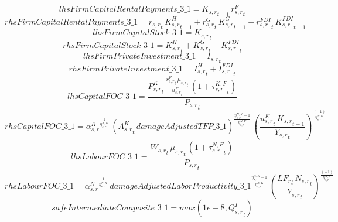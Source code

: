 \begin{dmath*}
lhsFirmCapitalRentalPayments\_3\_1 = {{K_{s,r}}}_{t-1}\, {{r^F_{s,r}}}_{t}
\end{dmath*}
\begin{dmath*}
rhsFirmCapitalRentalPayments\_3\_1 = {{r_{s,r}}}_{t}\, {{K^H_{s,r}}}_{t-1}+{{r^G_{s,r}}}_{t}\, {{K^G_{s,r}}}_{t-1}+{{r^{FDI}_{s,r}}}_{t}\, {{K^{FDI}_{s,r}}}_{t-1}
\end{dmath*}
\begin{dmath*}
lhsFirmCapitalStock\_3\_1 = {{K_{s,r}}}_{t}
\end{dmath*}
\begin{dmath*}
rhsFirmCapitalStock\_3\_1 = {{K^H_{s,r}}}_{t}+{{K^G_{s,r}}}_{t}+{{K^{FDI}_{s,r}}}_{t}
\end{dmath*}
\begin{dmath*}
lhsFirmPrivateInvestment\_3\_1 = {{I_{s,r}}}_{t}
\end{dmath*}
\begin{dmath*}
rhsFirmPrivateInvestment\_3\_1 = {{I^H_{s,r}}}_{t}+{{I^{FDI}_{s,r}}}_{t}
\end{dmath*}
\begin{dmath*}
lhsCapitalFOC\_3\_1 = \frac{{{P^K_{s,r}}}_{t}\, \frac{{{r^F_{s,r}}}_{t}\, {{\mu_{s,r}}}_{t}}{{{u^K_{s,r}}}_{t}}\, \left(1+{{\tau^{K,F}_{s,r}}}_{t}\right)}{{{P_{s,r}}}_{t}}
\end{dmath*}
\begin{dmath*}
rhsCapitalFOC\_3\_1 = {{\alpha^{K}_{s,r}}}^{\frac{1}{{{\eta^{N,K}_{s,r}}}}}\, \left({{A^{K}_{s,r}}}_{t}\, {damageAdjustedTFP\_3\_1}\right)^{\frac{{{\eta^{N,K}_{s,r}}}-1}{{{\eta^{N,K}_{s,r}}}}}\, \left(\frac{{{u^K_{s,r}}}_{t}\, {{K_{s,r}}}_{t-1}}{{{Y_{s,r}}}_{t}}\right)^{\frac{\left(-1\right)}{{{\eta^{N,K}_{s,r}}}}}
\end{dmath*}
\begin{dmath*}
lhsLabourFOC\_3\_1 = \frac{{{W_{s,r}}}_{t}\, {{\mu_{s,r}}}_{t}\, \left(1+{{\tau^{N,F}_{s,r}}}_{t}\right)}{{{P_{s,r}}}_{t}}
\end{dmath*}
\begin{dmath*}
rhsLabourFOC\_3\_1 = {{\alpha^{N}_{s,r}}}^{\frac{1}{{{\eta^{N,K}_{s,r}}}}}\, {damageAdjustedLaborProductivity\_3\_1}^{\frac{{{\eta^{N,K}_{s,r}}}-1}{{{\eta^{N,K}_{s,r}}}}}\, \left(\frac{{{LF_r}}_{t}\, {{N_{s,r}}}_{t}}{{{Y_{s,r}}}_{t}}\right)^{\frac{\left(-1\right)}{{{\eta^{N,K}_{s,r}}}}}
\end{dmath*}
\begin{dmath*}
safeIntermediateComposite\_3\_1 = max(1e-8,{{Q^{I}_{s,r}}}_{t})
\end{dmath*}
